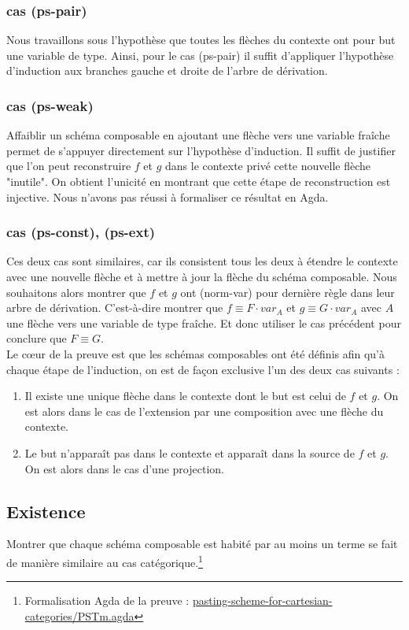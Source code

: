 \documentclass[conference]{IEEEtran}
\begin{document}
	\subsubsection{cas (ps-pair)}
	Nous travaillons sous l'hypothèse que toutes les flèches du contexte ont pour but une variable de type. Ainsi, pour le cas (ps-pair) il suffit d'appliquer l'hypothèse d'induction aux branches gauche et droite de l'arbre de dérivation.
	
	\subsubsection{cas (ps-weak)}
	Affaiblir un schéma composable en ajoutant une flèche vers une variable fraîche permet de s'appuyer directement sur l'hypothèse d'induction. Il suffit de justifier que l'on peut reconstruire $f$ et $g$ dans le contexte privé cette nouvelle flèche "inutile". On obtient l'unicité en montrant que cette étape de reconstruction est injective. Nous n'avons pas réussi à formaliser ce résultat en Agda.
	
	\subsubsection{cas (ps-const), (ps-ext)}
	Ces deux cas sont similaires, car ils consistent tous les deux à étendre le contexte avec une nouvelle flèche et à mettre à jour la flèche du schéma composable. Nous souhaitons alors montrer que $f$ et $g$ ont (norm-var) pour dernière règle dans leur arbre de dérivation. C'est-à-dire montrer que $f \equiv F \cdot var_A$ et $g \equiv G \cdot var_A$ avec $A$ une flèche vers une variable de type fraîche. Et donc utiliser le cas précédent pour conclure que $F \equiv G$. \\
	
	Le cœur de la preuve est que les schémas composables ont été définis afin qu'à chaque étape de l'induction, on est de façon exclusive l'un des deux cas suivants :
	\begin{enumerate}
		\item Il existe une unique flèche dans le contexte dont le but est celui de $f$ et $g$. On est alors dans le cas de l'extension par une composition avec une flèche du contexte.
		\item Le but n'apparaît pas dans le contexte et apparaît dans la source de $f$ et $g$. On est alors dans le cas d'une projection.
	\end{enumerate}
	
	\subsection{Existence}
	Montrer que chaque schéma composable est habité par au moins un terme se fait de manière similaire au cas catégorique.\footnote{Formalisation Agda de la preuve : \href{https://github.com/ehouget/L3-ENS-Internship/blob/main/pasting-scheme-for-cartesian-categories/PSTm.agda}{pasting-scheme-for-cartesian-categories/PSTm.agda}}
	
\end{document}
